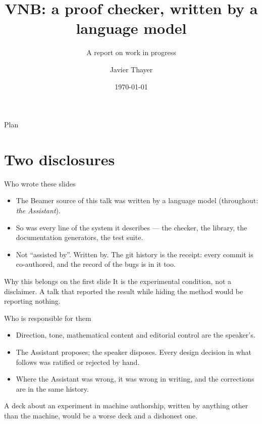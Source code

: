 \documentclass[11pt,aspectratio=169]{beamer}
\title[VNB]{VNB: a proof checker, written by a language model}
\subtitle{A report on work in progress}
\author{Javier Thayer}
\date{\today}
\begin{document}
\begin{frame}
  \titlepage
\end{frame}

\begin{frame}{Plan}
  \tableofcontents
\end{frame}

\section{Two disclosures}

\begin{frame}{Who wrote these slides}
  \begin{itemize}
    \item The Beamer source of this talk was written by a language model
          (throughout: \emph{the Assistant}).
    \item So was every line of the system it describes --- the checker, the
          library, the documentation generators, the test suite.
    \item Not ``assisted by''. Written by. The git history is the receipt:
          every commit is co-authored, and the record of the bugs is in it too.
  \end{itemize}
  \vfill
  \begin{block}{Why this belongs on the first slide}
    It is the experimental condition, not a disclaimer. A talk that reported
    the result while hiding the method would be reporting nothing.
  \end{block}
\end{frame}

\begin{frame}{Who is responsible for them}
  \begin{itemize}
    \item Direction, tone, mathematical content and editorial control are the
          speaker's.
    \item The Assistant proposes; the speaker disposes. Every design decision
          in what follows was ratified or rejected by hand.
    \item Where the Assistant was wrong, it was wrong in writing, and the
          corrections are in the same history.
  \end{itemize}
  \vfill
  A deck about an experiment in machine authorship, written by anything other
  than the machine, would be a worse deck and a dishonest one.
\end{frame}
\end{document}
